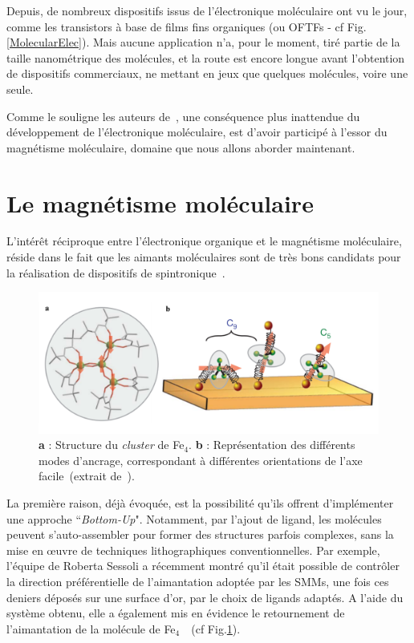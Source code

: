 Depuis, de nombreux dispositifs issus de l'électronique moléculaire ont vu le jour, comme les  transistors à base de films fins organiques (ou OFTFs - cf Fig.\ref{MolecularElec}). Mais aucune application n'a, pour le moment, tiré partie de la taille nanométrique des molécules, et la route est encore longue avant l'obtention de dispositifs commerciaux, ne mettant en jeux que quelques molécules, voire une seule.

Comme le souligne les auteurs de~\cite{Gatteschi2006}, une conséquence plus inattendue du développement de l'électronique moléculaire, est d'avoir participé à l'essor du magnétisme moléculaire, domaine que nous allons aborder maintenant.


\section{Le magnétisme moléculaire}
L’intérêt réciproque entre l'électronique organique et le magnétisme moléculaire, réside dans le fait que les aimants moléculaires sont de très bons candidats pour la réalisation de dispositifs de spintronique~\cite{Bogani2008,Sanvito2011}.

\begin{figure}
\centering \includegraphics[scale=0.45]{Spintronique/MolecularMag2/MolecularMag2.pdf}
\caption{\textbf{a} : Structure du \textit{cluster} de Fe$_4$. \textbf{b} : Représentation des différents modes d'ancrage, correspondant à différentes orientations de l'axe facile~(extrait de~\cite{Mannini2010}).}
\label{MolecularMag2}
\end{figure}

La première raison, déjà évoquée, est la possibilité qu'ils offrent d'implémenter une approche ``\textit{Bottom-Up}".
Notamment, par l'ajout de ligand, les molécules peuvent s'auto-assembler pour former des structures parfois complexes, sans la mise en œuvre de techniques lithographiques conventionnelles. Par exemple, l'équipe de Roberta Sessoli a récemment montré qu'il était possible de contrôler la direction préférentielle de l'aimantation adoptée par les SMMs, une fois ces deniers déposés sur une surface d'or, par le choix de ligands adaptés. A l'aide du système obtenu, elle a également mis en évidence le retournement de l'aimantation de la molécule de Fe$_{4}$~\cite{Mannini2010}~(cf Fig.\ref{MolecularMag2}).


